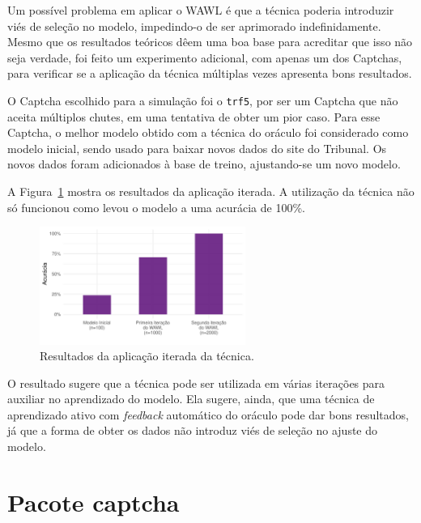 \documentclass[12pt,twoside,brazilian]{book}
\begin{document}
Um possível problema em aplicar o WAWL é que a técnica poderia
introduzir viés de seleção no modelo, impedindo-o de ser aprimorado
indefinidamente. Mesmo que os resultados teóricos dêem uma boa base para
acreditar que isso não seja verdade, foi feito um experimento adicional,
com apenas um dos Captchas, para verificar se a aplicação da técnica
múltiplas vezes apresenta bons resultados.

O Captcha escolhido para a simulação foi o \texttt{trf5}, por ser um
Captcha que não aceita múltiplos chutes, em uma tentativa de obter um
pior caso. Para esse Captcha, o melhor modelo obtido com a técnica do
oráculo foi considerado como modelo inicial, sendo usado para baixar
novos dados do site do Tribunal. Os novos dados foram adicionados à base
de treino, ajustando-se um novo modelo.

A Figura~\ref{fig-aplicacao-iterada} mostra os resultados da aplicação
iterada. A utilização da técnica não só funcionou como levou o modelo a
uma acurácia de 100\%.

\begin{figure}

{\centering \includegraphics[width=0.6\textwidth,height=\textheight]{./resultados_files/figure-pdf/fig-aplicacao-iterada-1.pdf}

}

\caption{\label{fig-aplicacao-iterada}Resultados da aplicação iterada da
técnica.}

\end{figure}

O resultado sugere que a técnica pode ser utilizada em várias iterações
para auxiliar no aprendizado do modelo. Ela sugere, ainda, que uma
técnica de aprendizado ativo com \emph{feedback} automático do oráculo
pode dar bons resultados, já que a forma de obter os dados não introduz
viés de seleção no ajuste do modelo.

\hypertarget{sec-pacote-captcha}{%
\section{Pacote captcha}\label{sec-pacote-captcha}}
\end{document}
